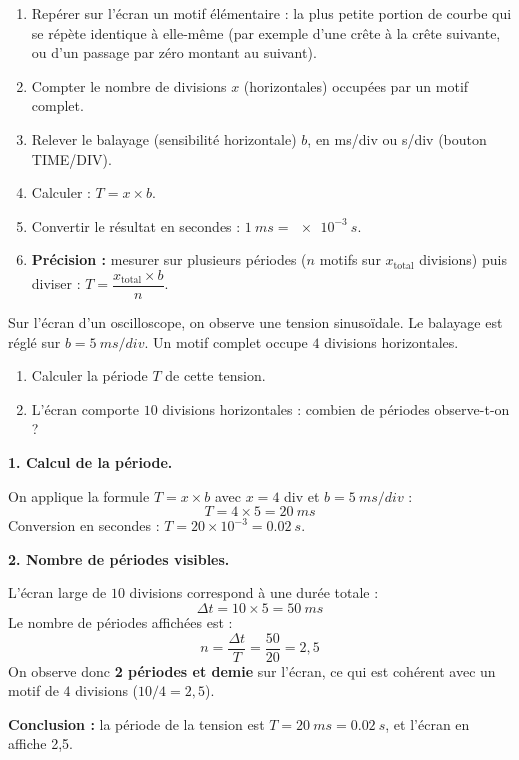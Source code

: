 \documentclass[11pt]{article}
\newcommand{\cle}[1]{{\popxbold\color{popdark}#1}}
\begin{document}
\begin{methode}
\begin{enumerate}
\item Repérer sur l'écran un \cle{motif élémentaire} : la plus petite portion de courbe qui se répète identique à elle-même (par exemple d'une crête à la crête suivante, ou d'un passage par zéro montant au suivant).
\item Compter le nombre de divisions $x$ (horizontales) occupées par un motif complet.
\item Relever le \cle{balayage} (sensibilité horizontale) $b$, en \si{ms/div} ou \si{s/div} (bouton TIME/DIV).
\item Calculer : $T = x \times b$.
\item Convertir le résultat en secondes : $\SI{1}{ms} = \SI{e-3}{s}$.
\item \textbf{Précision :} mesurer sur plusieurs périodes ($n$ motifs sur $x_{\text{total}}$ divisions) puis diviser : $T = \dfrac{x_{\text{total}} \times b}{n}$.
\end{enumerate}
\end{methode}

\begin{exoresolu}
Sur l'écran d'un oscilloscope, on observe une tension sinusoïdale. Le balayage est réglé sur $b = \SI{5}{ms/div}$. Un motif complet occupe $4$ divisions horizontales.
\begin{enumerate}
\item Calculer la période $T$ de cette tension.
\item L'écran comporte $10$ divisions horizontales : combien de périodes observe-t-on ?
\end{enumerate}
\tcblower
\textbf{1. Calcul de la période.}

On applique la formule $T = x \times b$ avec $x = 4$ div et $b = \SI{5}{ms/div}$ :
\[ T = 4 \times 5 = \SI{20}{ms} \]
Conversion en secondes : $T = 20 \times 10^{-3} = \SI{0,02}{s}$.

\textbf{2. Nombre de périodes visibles.}

L'écran large de $10$ divisions correspond à une durée totale :
\[ \Delta t = 10 \times 5 = \SI{50}{ms} \]
Le nombre de périodes affichées est :
\[ n = \dfrac{\Delta t}{T} = \dfrac{50}{20} = 2,5 \]
On observe donc \textbf{2 périodes et demie} sur l'écran, ce qui est cohérent avec un motif de $4$ divisions ($10 / 4 = 2,5$).

\textbf{Conclusion :} la période de la tension est $T = \SI{20}{ms} = \SI{0,02}{s}$, et l'écran en affiche 2,5.
\end{exoresolu}
\end{document}
